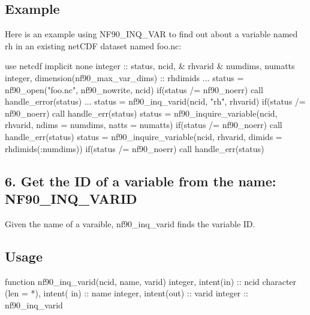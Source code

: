 \subsection*{Example}

Here is an example using N\+F90\+\_\+\+I\+N\+Q\+\_\+\+V\+AR to find out about a variable named rh in an existing net\+C\+DF dataset named foo.\+nc\+:


\begin{DoxyCode}
   \textcolor{keywordtype}{use }netcdf
   \textcolor{keywordtype}{implicit none}
   \textcolor{keywordtype}{integer}                            :: status, ncid, &
                                         rhvarid       &
                                         numdims, numatts
\textcolor{keywordtype}{integer}, \textcolor{keywordtype}{dimension(nf90\_max\_var\_dims)} :: rhdimids
...
status = nf90\_open(\textcolor{stringliteral}{"foo.nc"}, nf90\_nowrite, ncid)
\textcolor{keywordflow}{if}(status /= nf90\_noerr) \textcolor{keyword}{call }handle\_error(status)
...
status = nf90\_inq\_varid(ncid, \textcolor{stringliteral}{"rh"}, rhvarid)
\textcolor{keywordflow}{if}(status /= nf90\_noerr) \textcolor{keyword}{call }handle\_err(status)
status = nf90\_inquire\_variable(ncid, rhvarid, ndims = numdims, natts = numatts)
\textcolor{keywordflow}{if}(status /= nf90\_noerr) \textcolor{keyword}{call }handle\_err(status)
status = nf90\_inquire\_variable(ncid, rhvarid, dimids = rhdimids(:numdims))
\textcolor{keywordflow}{if}(status /= nf90\_noerr) \textcolor{keyword}{call }handle\_err(status)
\end{DoxyCode}
\hypertarget{f90-variables_f90-get-the-id-of-a-variable-from-the-name-nf90_inq_varid}{}\subsection{6. Get the I\+D of a variable from the name\+: N\+F90\+\_\+\+I\+N\+Q\+\_\+\+V\+A\+R\+I\+D }\label{f90-variables_f90-get-the-id-of-a-variable-from-the-name-nf90_inq_varid}
Given the name of a varaible, nf90\+\_\+inq\+\_\+varid finds the variable ID.

\subsection*{Usage}


\begin{DoxyCode}
\textcolor{keyword}{function }nf90\_inq\_varid(ncid, name, varid)
  \textcolor{keywordtype}{integer}, \textcolor{keywordtype}{intent(in)} :: ncid
  \textcolor{keywordtype}{character (len = *)}, \textcolor{keywordtype}{intent( in)} :: name
  \textcolor{keywordtype}{integer}, \textcolor{keywordtype}{intent(out)} :: varid
  \textcolor{keywordtype}{integer} :: nf90\_inq\_varid
\end{DoxyCode}


